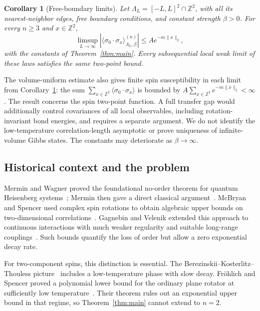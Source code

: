 \documentclass[11pt]{article}
\newtheorem{corollary}[theorem]{Corollary}
\theoremstyle{definition}
\theoremstyle{remark}
\newcommand{\Z}{\mathbb Z}
\numberwithin{equation}{section}
\begin{document}
\begin{corollary}[Free-boundary limits]\label{cor:limits}
Let $\Lambda_L=[-L,L]^2\cap\Z^2$, with all its nearest-neighbor edges,
free boundary conditions, and constant strength $\beta>0$. For every
$n\ge3$ and $x\in\Z^2$,
\begin{equation}
 \limsup_{L\to\infty}
 \left|\langle\sigma_0\cdot\sigma_x\rangle_{\Lambda_L,\beta}^{(n)}\right|
 \le A e^{-m\|x\|_2},
 \label{eq:limsup}
\end{equation}
with the constants of Theorem~\ref{thm:main}. Every subsequential local
weak limit of these laws satisfies the same two-point bound.
\end{corollary}

The volume-uniform estimate also gives finite spin susceptibility in
each limit from Corollary~\ref{cor:limits}: the sum
$\sum_{x\in\Z^2}\langle\sigma_0\cdot\sigma_x\rangle$
is bounded by $A\sum_{x\in\Z^2}e^{-m\|x\|_2}<\infty$.
The result concerns the spin two-point function. A full transfer gap
would additionally control covariances of all local observables,
including rotation-invariant bond energies, and requires a separate
argument. We do not identify the low-temperature correlation-length
asymptotic or prove uniqueness of infinite-volume Gibbs states.
The constants may deteriorate as $\beta\to\infty$.

\subsection{Historical context and the problem}

Mermin and Wagner proved the foundational no-order theorem for quantum
Heisenberg systems~\cite{MW}; Mermin then gave a direct classical
argument~\cite{Mermin1967}. McBryan and Spencer used complex spin
rotations to obtain algebraic upper bounds on two-dimensional
correlations~\cite{McBryanSpencer}. Gagnebin and Velenik extended this
approach to continuous interactions with much weaker regularity and
suitable long-range couplings~\cite{GagnebinVelenik}. Such bounds
quantify the loss of order but allow a zero exponential decay rate.

For two-component spins, this distinction is essential. The
Berezinskii--Kosterlitz--Thouless picture~\cite{Berezinskii,KosterlitzThouless}
includes a low-temperature phase with slow decay. Fr\"ohlich and
Spencer proved a polynomial lower bound for the ordinary plane rotator
at sufficiently low temperature~\cite[Theorem~C]{FS}. Their theorem
rules out an exponential upper bound in that regime, so
Theorem~\ref{thm:main} cannot extend to $n=2$.
\end{document}
